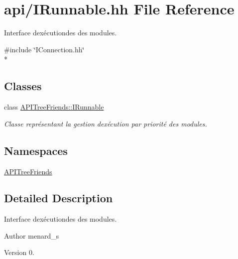 \hypertarget{_i_runnable_8hh}{}\section{api/\+I\+Runnable.hh File Reference}
\label{_i_runnable_8hh}


Interface d\textquotesingle{}exécutiondes des modules.  


{\ttfamily \#include \char`\"{}I\+Connection.\+hh\char`\"{}}\\*
\subsection*{Classes}
\begin{DoxyCompactItemize}
\item 
class \hyperlink{class_a_p_i_tree_friends_1_1_i_runnable}{A\+P\+I\+Tree\+Friends\+::\+I\+Runnable}
\begin{DoxyCompactList}\small\item\em Classe représentant la gestion d\textquotesingle{}exécution par priorité des modules. \end{DoxyCompactList}\end{DoxyCompactItemize}
\subsection*{Namespaces}
\begin{DoxyCompactItemize}
\item 
 \hyperlink{namespace_a_p_i_tree_friends}{A\+P\+I\+Tree\+Friends}
\end{DoxyCompactItemize}


\subsection{Detailed Description}
Interface d\textquotesingle{}exécutiondes des modules. 

\begin{DoxyAuthor}{Author}
menard\+\_\+s 
\end{DoxyAuthor}
\begin{DoxyVersion}{Version}
0. 
\end{DoxyVersion}
